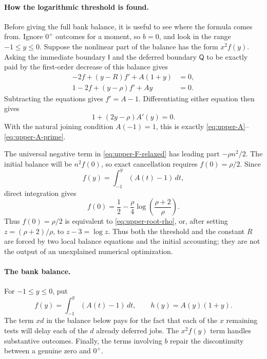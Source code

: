 \paragraph{How the logarithmic threshold is found.}
Before giving the full bank balance, it is useful to see where the formula
comes from.  Ignore $0^+$ outcomes for a moment, so $b=0$, and look in the
range $-1\le y\le0$.  Suppose the nonlinear part of the balance has the form
$x^2f(y)$.  Asking the immediate boundary $\mathsf I$ and the deferred
boundary $\mathsf Q$ to be exactly paid by the first-order decrease of this
balance gives
\begin{align}
 -2f+(y-R)f'+A(1+y)&=0,\label{eq:upper-design-I}\\
 1-2f+(y-\rho)f'+Ay&=0.\label{eq:upper-design-Q}
\end{align}
Subtracting the equations gives $f'=A-1$.  Differentiating either equation
then gives
\[
 1+(2y-\rho)A'(y)=0.
\]
With the natural joining condition $A(-1)=1$, this is exactly
\eqref{eq:upper-A}--\eqref{eq:upper-A-prime}.

The universal negative term in \eqref{eq:upper-F-relaxed} has leading
part $-\rho n^2/2$.  The initial balance will be $n^2f(0)$, so exact
cancellation requires $f(0)=\rho/2$.  Since
\begin{equation}
\label{eq:upper-f-definition}
 f(y)=\int_{-1}^{y}(A(t)-1)\,dt,
\end{equation}
direct integration gives
\[
 f(0)=\frac12-\frac{\rho}{4}
       \log\!\left(\frac{\rho+2}{\rho}\right).
\]
Thus $f(0)=\rho/2$ is equivalent to
\eqref{eq:upper-root-rho}, or, after setting $z=(\rho+2)/\rho$, to
$z-3=\log z$.  Thus both the threshold and the constant $R$ are forced by
two local balance equations and the initial accounting; they are not the
output of an unexplained numerical optimization.

\paragraph{The bank balance.}
For $-1\le y\le0$, put
\begin{equation}
\label{eq:upper-fh}
 f(y)=\int_{-1}^{y}(A(t)-1)\,dt,
 \qquad
 h(y)=A(y)(1+y).
\end{equation}
The term $x d$ in the balance below pays for the fact that each of the $x$
remaining tests will delay each of the $d$ already deferred jobs.  The
$x^2f(y)$ term handles substantive outcomes.  Finally, the terms involving
$b$ repair the discontinuity between a genuine zero and $0^+$.

